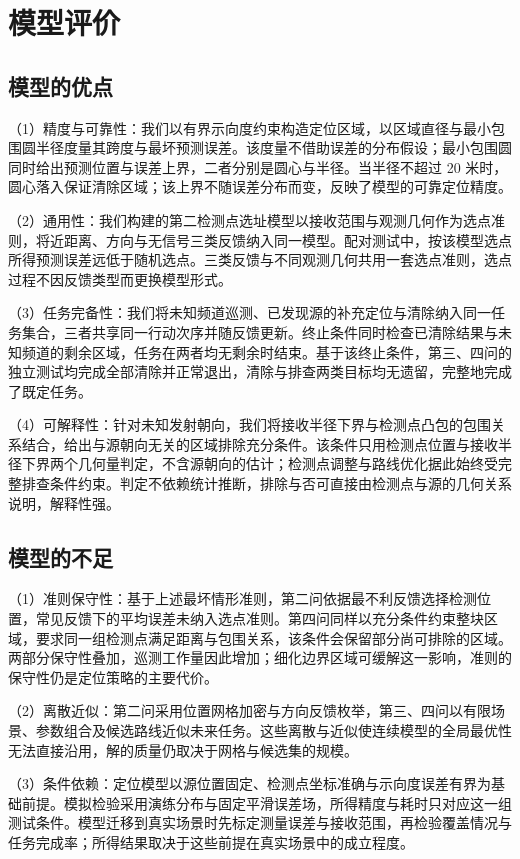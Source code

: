 \section{模型评价}

\subsection{模型的优点}

（1）精度与可靠性：我们以有界示向度约束构造定位区域，以区域直径与最小包围圆半径度量其跨度与最坏预测误差。该度量不借助误差的分布假设；最小包围圆同时给出预测位置与误差上界，二者分别是圆心与半径。当半径不超过 20 米时，圆心落入保证清除区域；该上界不随误差分布而变，反映了模型的可靠定位精度。

（2）通用性：我们构建的第二检测点选址模型以接收范围与观测几何作为选点准则，将近距离、方向与无信号三类反馈纳入同一模型。配对测试中，按该模型选点所得预测误差远低于随机选点。三类反馈与不同观测几何共用一套选点准则，选点过程不因反馈类型而更换模型形式。

（3）任务完备性：我们将未知频道巡测、已发现源的补充定位与清除纳入同一任务集合，三者共享同一行动次序并随反馈更新。终止条件同时检查已清除结果与未知频道的剩余区域，任务在两者均无剩余时结束。基于该终止条件，第三、四问的独立测试均完成全部清除并正常退出，清除与排查两类目标均无遗留，完整地完成了既定任务。

（4）可解释性：针对未知发射朝向，我们将接收半径下界与检测点凸包的包围关系结合，给出与源朝向无关的区域排除充分条件。该条件只用检测点位置与接收半径下界两个几何量判定，不含源朝向的估计；检测点调整与路线优化据此始终受完整排查条件约束。判定不依赖统计推断，排除与否可直接由检测点与源的几何关系说明，解释性强。

\subsection{模型的不足}

（1）准则保守性：基于上述最坏情形准则，第二问依据最不利反馈选择检测位置，常见反馈下的平均误差未纳入选点准则。第四问同样以充分条件约束整块区域，要求同一组检测点满足距离与包围关系，该条件会保留部分尚可排除的区域。两部分保守性叠加，巡测工作量因此增加；细化边界区域可缓解这一影响，准则的保守性仍是定位策略的主要代价。

（2）离散近似：第二问采用位置网格加密与方向反馈枚举，第三、四问以有限场景、参数组合及候选路线近似未来任务。这些离散与近似使连续模型的全局最优性无法直接沿用，解的质量仍取决于网格与候选集的规模。

（3）条件依赖：定位模型以源位置固定、检测点坐标准确与示向度误差有界为基础前提。模拟检验采用演练分布与固定平滑误差场，所得精度与耗时只对应这一组测试条件。模型迁移到真实场景时先标定测量误差与接收范围，再检验覆盖情况与任务完成率；所得结果取决于这些前提在真实场景中的成立程度。

